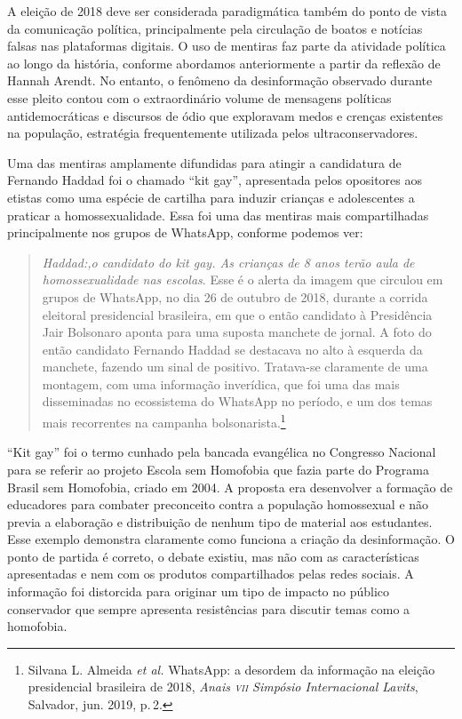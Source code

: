 A eleição de 2018 deve ser considerada paradigmática também do ponto de
vista da comunicação política, principalmente pela circulação de boatos
e notícias falsas nas plataformas digitais. O uso de mentiras faz parte
da atividade política ao longo da história, conforme abordamos
anteriormente a partir da reflexão de Hannah Arendt. No entanto, o
fenômeno da desinformação observado durante esse pleito contou com o
extraordinário volume de mensagens políticas antidemocráticas e discursos de
ódio que exploravam medos e crenças existentes na população, estratégia
frequentemente utilizada pelos ultraconservadores.

Uma das mentiras amplamente difundidas para atingir a candidatura de
Fernando Haddad foi o chamado ``kit gay'', apresentada pelos opositores
aos etistas como uma espécie de cartilha para induzir crianças e
adolescentes a praticar a homossexualidade. Essa foi uma das mentiras
mais compartilhadas principalmente nos grupos de WhatsApp, conforme
podemos ver:

\begin{quote}
\textit{Haddad:,o candidato do \emph{kit gay}. As crianças de 8 anos terão aula de
homossexualidade nas escolas}. Esse é o alerta da imagem que circulou
em grupos de WhatsApp, no dia 26 de outubro de 2018, durante a corrida
eleitoral presidencial brasileira, em que o então candidato à
Presidência Jair Bolsonaro aponta para uma suposta manchete de
jornal. A foto do então candidato Fernando Haddad se destacava no
alto à esquerda da manchete, fazendo um sinal de positivo. Tratava-se
claramente de uma montagem, com uma informação inverídica, que foi uma
das mais disseminadas no ecossistema do WhatsApp no período, e um dos
temas mais recorrentes na campanha bolsonarista.\footnote{Silvana L. Almeida \textit{et al.} WhatsApp: a desordem da informação na eleição presidencial brasileira de 2018, \textit{Anais \textsc{vii} Simpósio Internacional Lavits}, Salvador, jun. 2019, p.\,2.}
\end{quote}

``Kit gay'' foi o termo cunhado pela bancada evangélica no Congresso
Nacional para se referir ao projeto Escola sem Homofobia que fazia
parte do Programa Brasil sem Homofobia, criado em 2004. A proposta era
desenvolver a formação de educadores para combater preconceito contra a
população homossexual e não previa a elaboração e distribuição de nenhum
tipo de material aos estudantes. Esse exemplo demonstra claramente como
funciona a criação da desinformação. O ponto de partida é correto, o
debate existiu, mas não com as características apresentadas e nem com os
produtos compartilhados pelas redes sociais. A informação foi distorcida
para originar um tipo de impacto no público conservador que sempre
apresenta resistências para discutir temas como a homofobia.

